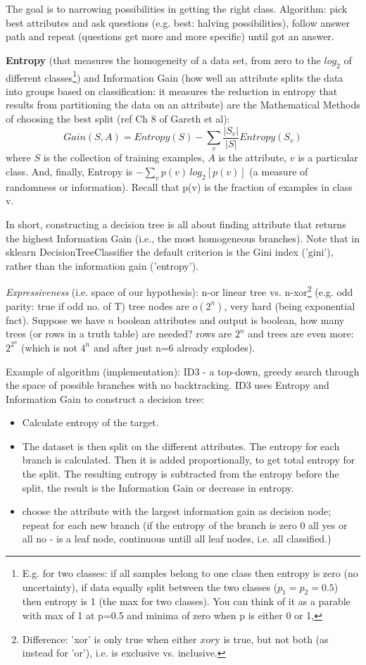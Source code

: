 \documentclass[11pt]{article}
\begin{document}
The goal is to narrowing possibilities in getting the right class. Algorithm: pick best attributes and ask questions (e.g. best: halving possibilities), follow answer path and repeat (questions get more and more specific) until got an answer. 

\textbf{Entropy} (that measures the homogeneity of a data set, from zero to the $log_2$ of different classes\footnote{E.g. for two classes: if all samples belong to one class then entropy is zero (no uncertainty), if data equally split between the two classes ($p_1 = p_2 = 0.5$) then entropy is 1 (the max for two classes). You can think of it as a parable with max of 1 at p=0.5 and minima of zero when p is either 0 or 1,}) and Information Gain (how well an attribute splits the data into groups based on classification: it measures the reduction in entropy that results from partitioning the data on an attribute) are the Mathematical Methods of choosing the best split (ref Ch 8 of Gareth et al):
\[ Gain(S, A) = Entropy(S) - \sum_v \frac{|S_v|}{|S|} Entropy(S_v)
\]
where $S$ is the collection of training examples, $A$ is the attribute, $v$ is a particular class. And, finally, Entropy is $-\sum_v p(v) \,log_2[p(v)]$ (a measure of randomness or information). Recall that p(v) is the fraction of examples in class v. 

In short, constructing a decision tree is all about finding attribute that returns the highest Information Gain (i.e., the most homogeneous branches). Note that in sklearn DecisionTreeClassifier the default criterion is the Gini index ('gini'), rather than the information gain ('entropy').  

\textit{Expressiveness} (i.e. space of our hypothesis): n-or linear tree vs. n-xor\footnote{Difference: 'xor' is only true when either $x or $y is true, but not both (as instead for 'or'), i.e. is exclusive vs. inclusive.} (e.g. odd parity: true if odd no. of T) tree nodes are $o(2^n)$, very hard (being exponential fnct). 
Suppose we have $n$ boolean attributes and output is boolean, how many trees (or rows in a truth table) are needed? rows are $2^n$ and trees are even more: $2^{2^n}$ (which is not $4^n$ and after just n=6 already explodes). 

Example of algorithm (implementation): ID3 - a top-down, greedy search through the space of possible branches with no backtracking. ID3 uses Entropy and Information Gain to construct a decision tree:
\begin{itemize}
	\item Calculate entropy of the target.
	\item The dataset is then split on the different attributes. The entropy for each branch is calculated. Then it is added proportionally, to get total entropy for the split. The resulting entropy is subtracted from the entropy before the split, the result is the Information Gain or decrease in entropy. 
	\item choose the attribute with the largest information gain as decision node; repeat for each new branch (if the entropy of the branch is zero 0 all yes or all no -  is a leaf node, continuous untill all leaf nodes, i.e. all classified.)
\end{itemize}
\end{document}

